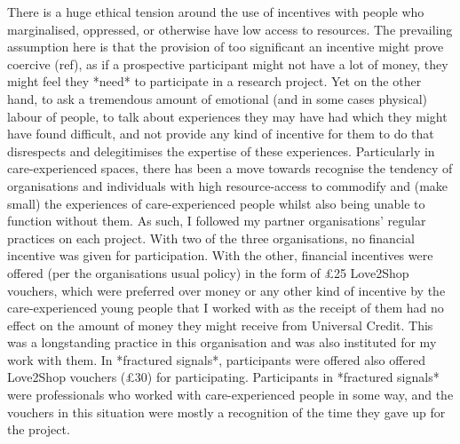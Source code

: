 There is a huge ethical tension around the use of incentives with people who marginalised, oppressed, or otherwise have low access to resources. The prevailing assumption here is that the provision of too significant an incentive might prove coercive (ref), as if a prospective participant might not have a lot of money, they might feel they *need* to participate in a research project. Yet on the other hand, to ask a tremendous amount of emotional (and in some cases physical) labour of people, to talk about experiences they may have had which they might have found difficult, and not provide any kind of incentive for them to do that disrespects and delegitimises the expertise of these experiences. Particularly in care-experienced spaces, there has been a move towards recognise the tendency of organisations and individuals with high resource-access to commodify and (make small) the experiences of care-experienced people whilst also being unable to function without them. As such, I followed my partner organisations’ regular practices on each project. With two of the three organisations, no financial incentive was given for participation. With the other, financial incentives were offered (per the organisations usual policy) in the form of £25 Love2Shop vouchers, which were preferred over money or any other kind of incentive by the care-experienced young people that I worked with as the receipt of them had no effect on the amount of money they might receive from Universal Credit. This was a longstanding practice in this organisation and was also instituted for my work with them. In *fractured signals*, participants were offered also offered Love2Shop vouchers (£30) for participating. Participants in *fractured signals* were professionals who worked with care-experienced people in some way, and the vouchers in this situation were mostly a recognition of the time they gave up for the project. 

